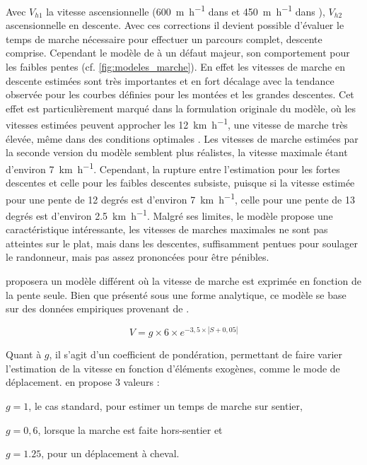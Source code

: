 Avec \(V_{h1}\) la vitesse ascensionnelle (\SI{600}{\meter\per\hour}
dans \textcite{Langmuir1984} et \SI{450}{\meter\per\hour} dans
\textcite{Langmuir2013}), \(V_{h2}\) ascensionnelle en descente. Avec
ces corrections il devient possible d'évaluer le temps de marche
nécessaire pour effectuer un parcours complet, descente
comprise.
Cependant le modèle de  à un défaut majeur, son
comportement pour les faibles pentes
(cf. \autoref{fig:modeles_marche}). En effet les vitesses de marche en
descente estimées sont très importantes et en fort décalage avec la
tendance observée pour les courbes définies pour les montées et les
grandes descentes. Cet effet est particulièrement marqué dans la
formulation originale du modèle, où les vitesses estimées peuvent
approcher les \SI{12}{\kilo\meter\per\hour}, une vitesse de marche
très élevée, même dans des conditions optimales
\autocite{Kerouanton2020}. Les vitesses de marche estimées par la
seconde version du modèle \autocite{Langmuir2013} semblent plus
réalistes, la vitesse maximale étant d'environ
\SI{7}{\kilo\meter\per\hour}. Cependant, la rupture entre l'estimation
pour les fortes descentes et celle pour les faibles descentes
subsiste, puisque si la vitesse estimée pour une pente de 12 degrés
est d'environ \SI{7}{\kilo\meter\per\hour}, celle pour une pente de 13
degrés est d'environ \SI{2,5}{\kilo\meter\per\hour}. Malgré ses
limites, le modèle  propose une caractéristique
intéressante, les vitesses de marches maximales ne sont pas atteintes
sur le plat, mais dans les descentes, suffisamment pentues pour
soulager le randonneur, mais pas assez prononcées pour être pénibles.

\textcite{Tobler1993} proposera un modèle différent où la vitesse de
marche est exprimée en fonction de la pente seule. Bien que présenté
sous une forme analytique, ce modèle se base sur des données
empiriques provenant de \textcite{Imhof1950} \autocite{Tobler1993}.

\begin{equation}
  \label{eq:marche_tobler}
  V = g × 6 × e^{-3,5 × \left| S + 0,05 \right|}
\end{equation}

Quant à \(g\), il s'agit d'un coefficient de
pondération, permettant de faire varier l'estimation de la vitesse en
fonction d'éléments exogènes, comme le mode de
déplacement. \textcite{Tobler1993} en propose 3 valeurs :
%
\begin{enumerate*}[label=(\alph*)]
\item \(g = 1\), le cas standard, pour estimer un temps de marche sur
  sentier,
\item \(g = 0,6\), lorsque la marche est faite hors-sentier et
\item  \(g = 1.25\), pour un déplacement à cheval.
\end{enumerate*}
%

